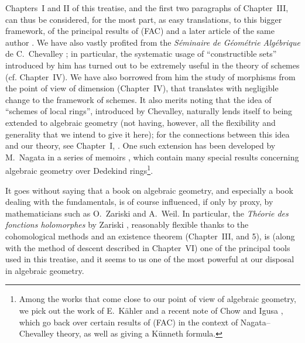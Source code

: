 Chapters~I and II of this treatise, and the first two paragraphs of Chapter~III, can thus be considered, for the most part, as easy translations, to this bigger framework, of the principal results of (FAC) and a later article of the same author \cite{I-15}.
We have also vastly profited from the \emph{S\'eminaire de G\'eom\'etrie Alg\'ebrique} de C.~Chevalley \cite{I-1};
in particular, the systematic usage of ``constructible sets'' introduced by him has turned out to be extremely useful in the theory of schemes (cf. Chapter~IV).
We have also borrowed from him the study of morphisms from the point of view of dimension (Chapter~IV), that translates with negligible change to the framework of schemes.
It also merits noting that the idea of ``schemes of local rings'', introduced by Chevalley, naturally lends itself to being extended to algebraic geometry (not having, however, all the flexibility and generality that we intend to give it here);
for the connections between this idea and our theory, see Chapter~I, .
One such extension has been developed by M.~Nagata in a series of memoirs \cite{I-9}, which contain many special results concerning algebraic geometry over Dedekind rings\footnote{Among the works that come close to our point of view of algebraic geometry, we pick out the work of E.~K\"ahler \cite{I-22} and a recent note of Chow and Igusa \cite{I-3}, which go back over certain results of (FAC) in the context of Nagata--Chevalley theory, as well as giving a K\"unneth formula.}.

\sectionbreak

It goes without saying that a book on algebraic geometry, and especially a book dealing with the fundamentals, is of course influenced, if only by proxy, by mathematicians such as O.~Zariski and A.~Weil.
In particular, the \emph{Th\'eorie des fonctions holomorphes} by Zariski \cite{I-20}, reasonably flexible thanks to the cohomological methods and an existence theorem (Chapter~III, \textsection{} and 5), is (along with the method of descent described in Chapter~VI) one of the principal tools used in this treatise, and it seems to us one of the most powerful at our disposal in algebraic geometry.

